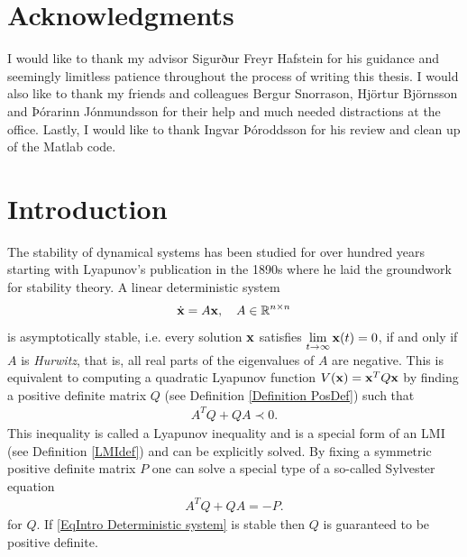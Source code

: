 \documentclass[a4paper,12pt,twoside,BCOR=10mm]{scrbook}
\begin{document}

\chapter*{Acknowledgments}
I would like to thank my advisor Sigurður Freyr Hafstein for his guidance and seemingly limitless patience throughout the process of writing this thesis. I would also like to thank my friends and colleagues Bergur Snorrason, Hjörtur Björnsson and Þórarinn Jónmundsson for their help and much needed distractions at the office. Lastly, I would like to thank Ingvar Þóroddsson for his review and clean up of the Matlab code.

\chapter{Introduction}
\setcounter{page}{1}

The stability of dynamical systems has been studied for over hundred years starting with Lyapunov's publication in the 1890s where he laid the groundwork for stability theory. A linear deterministic system
\begin{align}\label{EqIntro Deterministic system}
    \Dot{\mathbf{x}} = A\mathbf{x},\quad A \in \mathbb{R}^{n\times n}
\end{align}
is asymptotically stable, i.e. every solution $\mathbf{x}$ satisfies $\lim\limits_{t\to\infty} \mathbf{x}(t) = 0$, if and only if $A$ is \textit{Hurwitz}, that is, all real parts of the eigenvalues of $A$ are negative. This is equivalent to computing a quadratic Lyapunov function $V(\mathbf{x}) = \mathbf{x}^T Q \mathbf{x}$ by finding a positive definite matrix $Q$ (see Definition \ref{Definition PosDef}) such that
\begin{align*}
    A^TQ + QA \prec 0.
\end{align*}
This inequality is called a Lyapunov inequality and is a special form of an LMI (see Definition \ref{LMIdef}) and can be explicitly solved. By fixing a symmetric positive definite matrix $P$ one can solve a special type of a so-called Sylvester equation \citep{sylvester1884}
\begin{align*}
    A^TQ + QA = -P.
\end{align*}
for $Q$. If \eqref{EqIntro Deterministic system} is stable then $Q$ is guaranteed to be positive definite.
\end{document}
